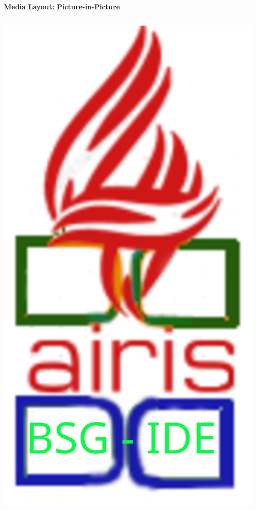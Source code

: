 \documentclass[aspectratio=169]{beamer}
\begin{document}
\begin{frame}{\Large\textbf{Media Layout: Picture-in-Picture}}
\begin{columns}[T]
\begin{column}{0.28\textwidth}
            \includegraphics[width=\textwidth,keepaspectratio]{bsg-ide.png}
        \end{column}
    \end{columns}
\end{frame}
\end{document}
